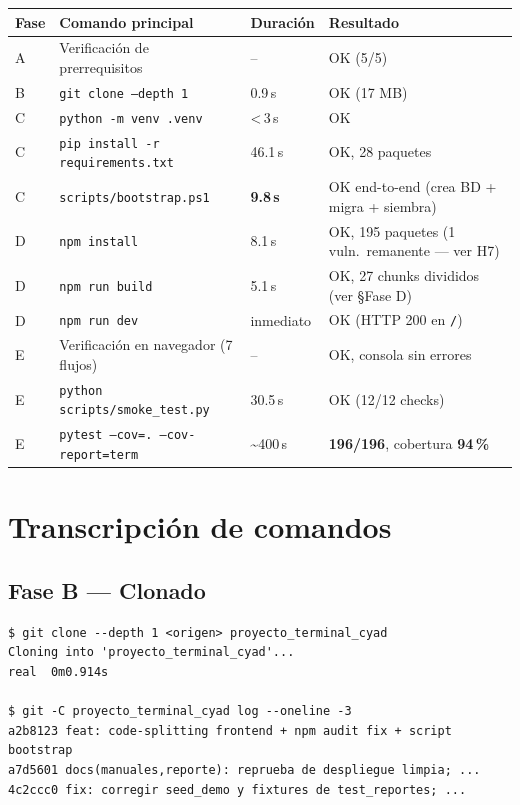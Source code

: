 \documentclass{computacion}
\begin{document}
\begin{longtable}{p{} p{} p{} p{}}
    \toprule
    \textbf{Fase} & \textbf{Comando principal} & \textbf{Duración} & \textbf{Resultado} \\
    \midrule
    \endhead
    A & Verificación de prerrequisitos             & --      & OK (5/5) \\
    B & \texttt{git clone --depth 1}               & 0.9\,s  & OK (17 MB) \\
    C & \texttt{python -m venv .venv}              & \textless\,3\,s & OK \\
    C & \texttt{pip install -r requirements.txt}   & 46.1\,s & OK, 28 paquetes \\
    C & \texttt{scripts/bootstrap.ps1}             & \textbf{9.8\,s}  & OK end-to-end (crea BD + migra + siembra) \\
    D & \texttt{npm install}                       & 8.1\,s  & OK, 195 paquetes (1 vuln.\ remanente — ver H7) \\
    D & \texttt{npm run build}                     & 5.1\,s  & OK, 27 chunks divididos (ver §Fase D) \\
    D & \texttt{npm run dev}                       & inmediato & OK (HTTP 200 en \texttt{/}) \\
    E & Verificación en navegador (7 flujos)       & --      & OK, consola sin errores \\
    E & \texttt{python scripts/smoke\_test.py}     & 30.5\,s & OK (12/12 checks) \\
    E & \texttt{pytest --cov=. --cov-report=term}  & \textasciitilde 400\,s & \textbf{196/196}, cobertura \textbf{94\,\%} \\
    \bottomrule
\end{longtable}

\section{Transcripción de comandos}

\subsection{Fase B — Clonado}

\begin{Verbatim}[fontsize=\small, frame=single]
$ git clone --depth 1 <origen> proyecto_terminal_cyad
Cloning into 'proyecto_terminal_cyad'...
real  0m0.914s

$ git -C proyecto_terminal_cyad log --oneline -3
a2b8123 feat: code-splitting frontend + npm audit fix + script bootstrap
a7d5601 docs(manuales,reporte): reprueba de despliegue limpia; ...
4c2ccc0 fix: corregir seed_demo y fixtures de test_reportes; ...
\end{Verbatim}
\end{document}

